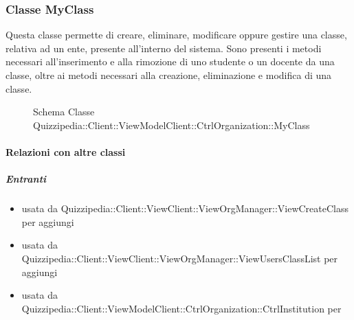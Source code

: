 \subsubsection{Classe MyClass}
Questa classe permette di creare, eliminare, modificare oppure gestire una classe, relativa ad un ente, presente all'interno del sistema.
Sono presenti i metodi necessari all'inserimento e alla rimozione di uno studente o un docente da una classe, oltre ai metodi necessari alla creazione, eliminazione e modifica di una classe.
\begin{figure}[H]
\centering
\noindent{}
\caption[Schema Classe MyClass]{Schema Classe Quizzipedia::Client::ViewModelClient::CtrlOrganization::MyClass}
\end{figure}
\paragraph{Relazioni con altre classi}
\subparagraph{Entranti}
\begin{itemize}
\item usata da Quizzipedia::Client::ViewClient::ViewOrgManager::ViewCreateClass per aggiungi
\item usata da Quizzipedia::Client::ViewClient::ViewOrgManager::ViewUsersClassList per aggiungi
\item usata da Quizzipedia::Client::ViewModelClient::CtrlOrganization::CtrlInstitution per 
\end{itemize}
